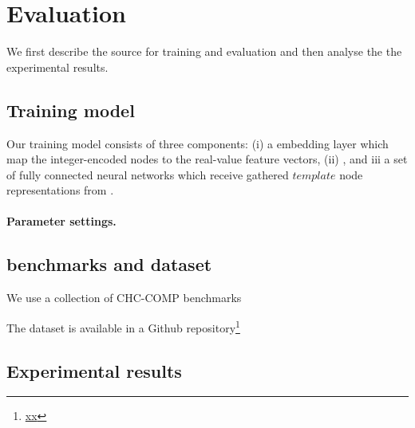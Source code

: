 
% 


\section{Evaluation}
We first describe the source for training and evaluation and then analyse the the experimental results. 


\subsection{Training model}
Our training model consists of three components: (i) a embedding layer which map the integer-encoded nodes to the real-value feature vectors, (ii) \hyperedgeGNN, and {iii} a set of fully connected neural networks which receive gathered $\textit{template}$ node representations from \hyperedgeGNNs.

\paragraph{Parameter settings.}


\subsection{benchmarks and dataset}
We use a collection of CHC-COMP benchmarks~\cite{chcBenchmark}

The dataset is available in a Github repository\footnote{\url{xx}}

\subsection{Experimental results}



% 


